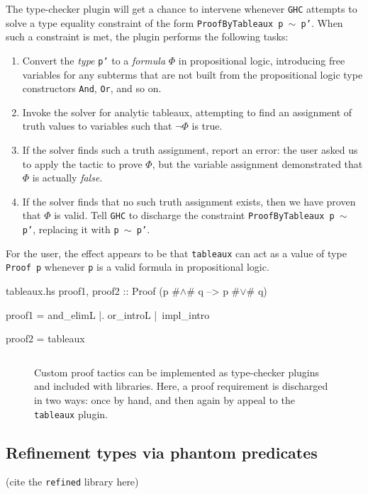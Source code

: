 \documentclass[format=sigplan, review=false, screen=true]{acmart}
\begin{document}
The type-checker plugin will get a chance to intervene whenever \texttt{GHC}
attempts to solve a type equality constraint of the form \texttt{ProofByTableaux p $\sim$ p'}.
When such a constraint is met, the plugin performs the following tasks:
\begin{enumerate}
\item Convert the \emph{type} \texttt{p'} to a \emph{formula} $\Phi$ in propositional
  logic, introducing free variables for any subterms that are not built from the
  propositional logic type constructors \texttt{And}, \texttt{Or}, and so on.
\item Invoke the solver for analytic tableaux, attempting to find an assignment of truth
  values to variables such that $\neg \Phi$ is true.
\item If the solver finds such a truth assignment, report an error: the user asked us
  to apply the tactic to prove $\Phi$, but the variable assignment demonstrated that
  $\Phi$ is actually \emph{false}.
\item If the solver finds that no such truth assignment exists, then we have proven that
  $\Phi$ is valid. Tell \texttt{GHC} to discharge the constraint \texttt{ProofByTableaux p $\sim$ p'}, replacing it with \texttt{p $\sim$ p'}.
\end{enumerate}
For the user, the effect appears to be that \texttt{tableaux} can act as a value of
type \texttt{Proof p} whenever \texttt{p} is a valid formula in propositional logic.

\begin{filecontents*}{tableaux.hs}
proof1, proof2 :: Proof (p #$\wedge$# q --> p #$\vee$# q)
  
proof1 =  and_elimL
       |. or_introL
       |\ impl_intro

proof2 = tableaux
\end{filecontents*}

\begin{figure}
  \inputminted{haskell}{tableaux.hs}
  \caption{Custom proof tactics can be implemented as type-checker plugins and
    included with libraries. Here, a proof requirement is discharged in two ways:
    once by hand, and then again by appeal to the \texttt{tableaux} plugin.
    \label{tableaux-example}}
\end{figure}

\subsection{Refinement types via phantom predicates}

(cite the \texttt{refined} library here) \cite{refined}




  
\end{document}
